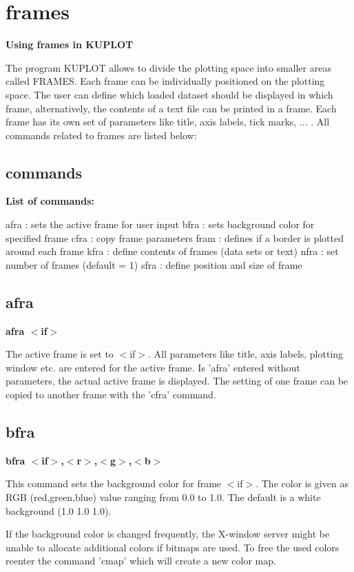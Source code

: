 \section{frames}
{\bf Using frames in KUPLOT \par }
\par
\vspace{3pt}
The program KUPLOT allows to divide the plotting space into smaller 
areas called FRAMES. Each frame can be individually positioned on the 
plotting space. The user can define which loaded dataset should be 
displayed in which frame, alternatively, the contents of a text file 
can be printed in a frame. Each frame has its own set of parameters 
like title, axis labels, tick marks, ... . All commands related to 
frames are listed below: 
\par
\subsection*{commands}
{\bf List of commands: \par }
\par
\begin{MacVerbatim}
afra : sets the active frame for user input
bfra : sets background color for specified frame
cfra : copy frame parameters
fram : defines if a border is plotted around each frame
kfra : define contents of frames (data sets or text)
nfra : set number of frames (default = 1)
sfra : define position and size of frame
\end{MacVerbatim}
\subsection*{afra}
{\bf afra $ <$if$> $ \par }
\par
\vspace{3pt}
The active frame is set to $ <$if$> $. All parameters like title, axis labels, 
plotting window etc. are entered for the active frame. Is 'afra' entered 
without parameters, the actual active frame is displayed. The setting 
of one frame can be copied to another frame with the 'cfra' command. 
\subsection*{bfra}
{\bf bfra $ <$if$> $,$ <$r$> $,$ <$g$> $,$ <$b$> $ \par }
\par
\vspace{3pt}
This command sets the background color for frame $ <$if$> $. The color is 
given as RGB (red,green,blue) value ranging from 0.0 to 1.0. The 
default is a white background (1.0 1.0 1.0). 
\par
If the background color is changed frequently, the X-window server 
might be unable to allocate additional colors if bitmaps are used. 
To free the used colors reenter the command 'cmap' which will create 
a new color map. 
